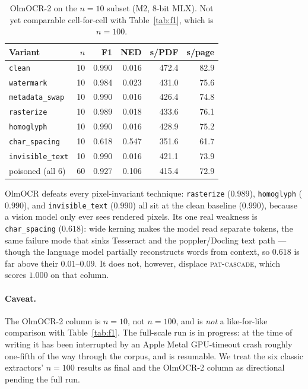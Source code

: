 \documentclass[11pt]{article}
\newcommand{\variant}[1]{\texttt{#1}}
\begin{document}
\begin{table}[tbp]
\centering
\caption{OlmOCR-2 on the $n=10$ subset (M2, 8-bit MLX). Not yet
  comparable cell-for-cell with Table~\ref{tab:f1}, which is $n=100$.}
\label{tab:olmocr}
\small
\setlength{\tabcolsep}{6pt}
\begin{tabular}{@{}l r r r r r@{}}
\toprule
\textbf{Variant} & $n$ & \textbf{F1} & \textbf{NED} &
  \textbf{s/PDF} & \textbf{s/page}\\
\midrule
\variant{clean}          & 10 & 0.990 & 0.016 & 472.4 & 82.9\\
\variant{watermark}      & 10 & 0.984 & 0.023 & 431.0 & 75.6\\
\variant{metadata\_swap} & 10 & 0.990 & 0.016 & 426.4 & 74.8\\
\variant{rasterize}      & 10 & 0.989 & 0.018 & 433.6 & 76.1\\
\variant{homoglyph}      & 10 & 0.990 & 0.016 & 428.9 & 75.2\\
\variant{char\_spacing}  & 10 & 0.618 & 0.547 & 351.6 & 61.7\\
\variant{invisible\_text}& 10 & 0.990 & 0.016 & 421.1 & 73.9\\
\midrule
poisoned (all 6)         & 60 & 0.927 & 0.106 & 415.4 & 72.9\\
\bottomrule
\end{tabular}
\end{table}

OlmOCR defeats every pixel-invariant technique: \variant{rasterize}
($0.989$), \variant{homoglyph} ($0.990$), and \variant{invisible\_text}
($0.990$) all sit at the clean baseline ($0.990$), because a vision
model only ever sees rendered pixels. Its one real weakness is
\variant{char\_spacing} ($0.618$): wide kerning makes the model read
separate tokens, the same failure mode that sinks Tesseract and the
poppler/Docling text path --- though the language model partially
reconstructs words from context, so $0.618$ is far above their
$0.01$--$0.09$. It does not, however, displace \textsc{pat-cascade},
which scores $1.000$ on that column.

\paragraph{Caveat.} The OlmOCR-2 column is $n=10$, not $n=100$, and is
\emph{not} a like-for-like comparison with Table~\ref{tab:f1}. The
full-scale run is in progress: at the time of writing it has been
interrupted by an Apple Metal GPU-timeout crash roughly one-fifth of the
way through the corpus, and is resumable. We treat the six classic
extractors' $n=100$ results as final and the OlmOCR-2 column as
directional pending the full run.
\end{document}
